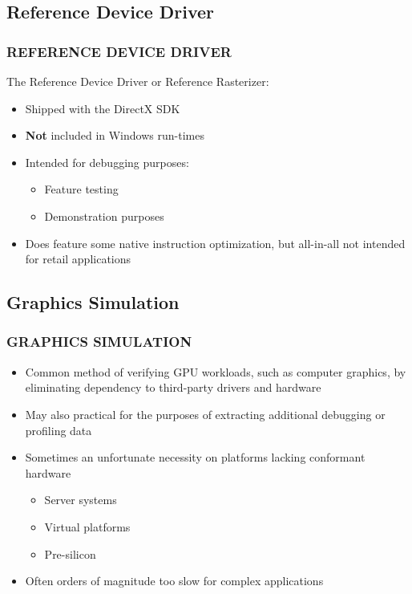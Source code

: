 \subsection{Reference Device Driver}
\begin{frame}
\frametitle{REFERENCE DEVICE DRIVER}

The Reference Device Driver or Reference Rasterizer:
\begin{itemize}
\item Shipped with the DirectX SDK
\item \textbf{Not} included in Windows run-times
\item Intended for debugging purposes:
  \begin{itemize}
  \item Feature testing
  \item Demonstration purposes
  \end{itemize}
\item Does feature some native instruction optimization, but all-in-all not intended for retail applications
\end{itemize}

\end{frame}

\subsection{Graphics Simulation}
\begin{frame}
\frametitle{GRAPHICS SIMULATION}

\begin{itemize}
\item Common method of verifying GPU workloads, such as computer graphics, by eliminating dependency to third-party drivers and hardware
\item May also practical for the purposes of extracting additional debugging or profiling data
\item Sometimes an unfortunate necessity on platforms lacking conformant hardware
  \begin{itemize}
  \item Server systems
  \item Virtual platforms
  \item Pre-silicon
  \end{itemize}
\item Often orders of magnitude too slow for complex applications
\end{itemize}

\end{frame}


